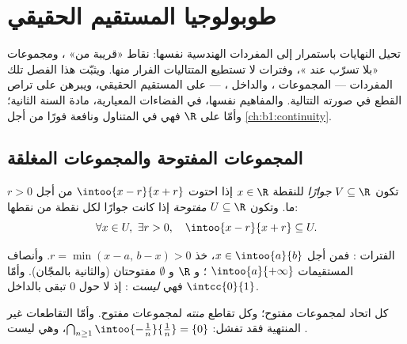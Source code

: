 \chapter{طوبولوجيا المستقيم الحقيقي}\label{ch:b1:topology}

تحيل النهايات باستمرار إلى المفردات الهندسية نفسها: نقاط
«قريبة من» ، ومجموعات «بلا تسرّب عند »، وفترات
لا تستطيع المتتاليات الفرار منها. ويثبّت هذا الفصل تلك المفردات ---
المجموعات  ، والداخل ،  --- على المستقيم
الحقيقي، ويبرهن على تراص القطع في صورته التتالية.
والمفاهيم نفسها، في الفضاءات المعيارية، مادة السنة الثانية؛
وأمّا على $\R$ فهي في المتناول ونافعة فورًا من أجل
\cref{ch:b1:continuity}.

\section{المجموعات المفتوحة والمجموعات المغلقة}

\begin{definition}\label{def:b1:topology:open}
تكون  $V \subseteq \R$ \emph{جوارًا}
للنقطة $x \in \R$ إذا احتوت  $\intoo{x - r}{x + r}$ من أجل
$r > 0$ ما. وتكون  $U \subseteq \R$ \emph{مفتوحة}
إذا كانت جوارًا لكل نقطة من نقطها:
\[
\forall x \in U,\ \exists r > 0, \quad \intoo{x - r}{x + r}
\subseteq U .
\]
\end{definition}

\begin{example}\label{ex:b1:topology:open}
الفترات  : فمن أجل $x \in \intoo{a}{b}$، خذ $r = \min(x -
a,\, b - x) > 0$. وأنصاف المستقيمات $\intoo{a}{+\infty}$ ؛ و $\R$ و
$\emptyset$ مفتوحتان (والثانية بالمجّان). وأمّا $\intcc{0}{1}$ فهي
\emph{ليست} : إذ لا  حول $0$ تبقى بالداخل.
\end{example}

\begin{proposition}\label{prop:b1:topology:openstable}
كل اتحاد لمجموعات  مفتوح؛ وكل تقاطع \emph{منته} لمجموعات
 مفتوح. وأمّا التقاطعات غير المنتهية فقد تفشل:
$\bigcap_{n \geq 1} \intoo{-\frac 1n}{\frac 1n} = \{0\}$، وهي ليست .
\end{proposition}

